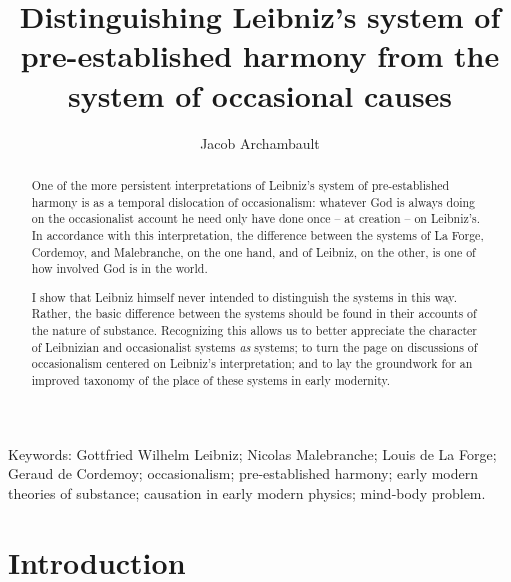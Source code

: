 \documentclass{article}
\title{Distinguishing Leibniz's system of pre-established harmony from the system of occasional causes}
\author{Jacob Archambault}
\begin{document}
\maketitle

  
\begin{abstract}
One of the more persistent interpretations of
Leibniz's system of pre-established harmony is as a temporal dislocation
of occasionalism: whatever God is always doing on the occasionalist
account he need only have done once -- at creation -- on Leibniz's. In
accordance with this interpretation, the difference between the systems
of La Forge, Cordemoy, and Malebranche, on the one hand, and of Leibniz,
on the other, is one of how involved God is in the world.

I show that Leibniz himself never intended to distinguish the systems in
this way. Rather, the basic difference between the systems should be
found in their accounts of the nature of substance. Recognizing this
allows us to better appreciate the character of Leibnizian and
occasionalist systems \emph{as} systems; to turn the page on discussions
of occasionalism centered on Leibniz's interpretation; and to lay the
groundwork for an improved taxonomy of the place of these systems in
early modernity.
\end{abstract}

Keywords: Gottfried Wilhelm Leibniz; Nicolas Malebranche; Louis de La
Forge; Geraud de Cordemoy; occasionalism; pre-established harmony; early
modern theories of substance; causation in early modern physics;
mind-body problem.

\section{Introduction}
\end{document}
